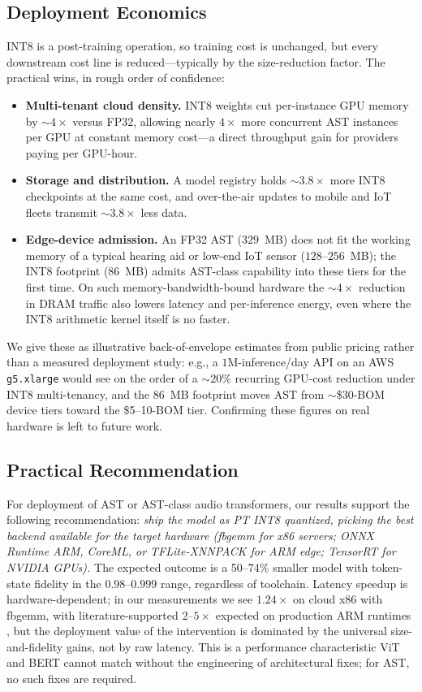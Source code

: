 \documentclass[conference]{IEEEtran}
\begin{document}
\subsection{Deployment Economics}

INT8 is a post-training operation, so training cost is unchanged, but every downstream cost line is reduced---typically by the size-reduction factor. The practical wins, in rough order of confidence:
\begin{itemize}
    \item \textbf{Multi-tenant cloud density.} INT8 weights cut per-instance GPU memory by $\sim 4\times$ versus FP32, allowing nearly $4\times$ more concurrent AST instances per GPU at constant memory cost---a direct throughput gain for providers paying per GPU-hour.
    \item \textbf{Storage and distribution.} A model registry holds $\sim 3.8\times$ more INT8 checkpoints at the same cost, and over-the-air updates to mobile and IoT fleets transmit $\sim 3.8\times$ less data.
    \item \textbf{Edge-device admission.} An FP32 AST ($329$~MB) does not fit the working memory of a typical hearing aid or low-end IoT sensor ($128$--$256$~MB); the INT8 footprint ($86$~MB) admits AST-class capability into these tiers for the first time. On such memory-bandwidth-bound hardware the $\sim 4\times$ reduction in DRAM traffic also lowers latency and per-inference energy, even where the INT8 arithmetic kernel itself is no faster.
\end{itemize}
We give these as illustrative back-of-envelope estimates from public pricing rather than a measured deployment study: e.g., a $1$M-inference/day API on an AWS \texttt{g5.xlarge} would see on the order of a $\sim 20\%$ recurring GPU-cost reduction under INT8 multi-tenancy, and the $86$~MB footprint moves AST from $\sim$\$$30$-BOM device tiers toward the $\$$5--10-BOM tier. Confirming these figures on real hardware is left to future work.

\subsection{Practical Recommendation}
For deployment of AST or AST-class audio transformers, our results support the following recommendation: \emph{ship the model as PT INT8 quantized, picking the best backend available for the target hardware (fbgemm for x86 servers; ONNX Runtime ARM, CoreML, or TFLite-XNNPACK for ARM edge; TensorRT for NVIDIA GPUs).} The expected outcome is a 50--74\% smaller model with token-state fidelity in the $0.98$--$0.999$ range, regardless of toolchain. Latency speedup is hardware-dependent; in our measurements we see $1.24\times$ on cloud x86 with fbgemm, with literature-supported $2$--$5\times$ expected on production ARM runtimes \cite{bondarenko2023quantizable}, but the deployment value of the intervention is dominated by the universal size-and-fidelity gains, not by raw latency. This is a performance characteristic ViT and BERT cannot match without the engineering of architectural fixes; for AST, no such fixes are required.
\end{document}
